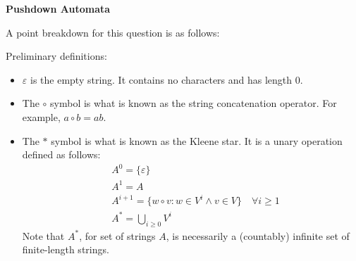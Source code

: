 \documentclass[addpoints]{exam}
\begin{document}
\begin{questions}

\question[69] \textbf{Pushdown Automata} 

A point breakdown for this question is as follows:
\begin{center}  \end{center}

Preliminary definitions: 
\begin{itemize}
    \item $\varepsilon$ is the empty string. It contains no characters and has length $0$.
    \item The $\circ$ symbol is what is known as the string concatenation operator. For example, $a \circ b = ab$.
    \item The $*$ symbol is what is known as the Kleene star. It is a unary operation defined as follows: $$\begin{aligned}
        &A^0 = \{\varepsilon\} \\
        &A^1 = A \\
        &A^{i + 1} = \{w\circ v : w\in V^i \land v\in V\} \quad \forall i \geq 1 \\
        &A^* = \bigcup_{i\geq 0} V^i
    \end{aligned}$$ 
    Note that $A^*$, for set of strings $A$, is necessarily a (countably) infinite set of finite-length strings.
\end{itemize}


\end{questions}
\end{document}
